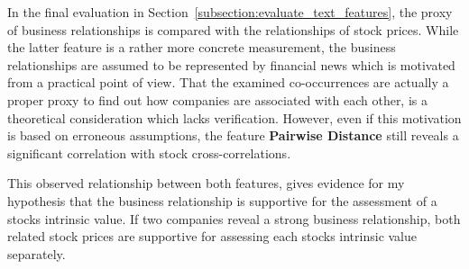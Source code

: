 In the final evaluation in Section~\ref{subsection:evaluate_text_features}, the proxy of business relationships is compared with the relationships of stock prices. While the latter feature is a rather more concrete measurement, the business relationships are assumed to be represented by financial news which is motivated from a practical point of view. That the examined co-occurrences are actually a proper proxy to find out how companies are associated with each other, is a theoretical consideration which lacks verification. However, even if this motivation is based on erroneous assumptions, the feature \textbf{Pairwise Distance} still reveals a significant correlation with stock cross-correlations. 

This observed relationship between both features, gives evidence for my hypothesis that the business relationship is supportive for the assessment of a stocks intrinsic value. If two companies reveal a strong business relationship, both related stock prices are supportive for assessing each stocks intrinsic value separately.

